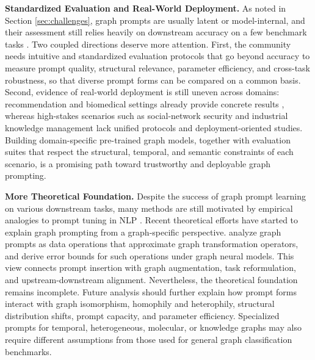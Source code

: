 \textbf{Standardized Evaluation and Real-World Deployment.} As noted in Section \ref{sec:challenges}, graph prompts are usually latent or model-internal, and their assessment still relies heavily on downstream accuracy on a few benchmark tasks \cite{hamilton2017inductive, xu2018how}. Two coupled directions deserve more attention. First, the community needs intuitive and standardized evaluation protocols that go beyond accuracy to measure prompt quality, structural relevance, parameter efficiency, and cross-task robustness, so that diverse prompt forms \cite{gong2024selfpro, ge2024psp, fu2025edge, yan2024igap} can be compared on a common basis. Second, evidence of real-world deployment is still uneven across domains: recommendation and biomedical settings already provide concrete results \cite{yang2024graphpro, zhang2024gpt4rec, wang2024ddiprompt}, whereas high-stakes scenarios such as social-network security and industrial knowledge management lack unified protocols and deployment-oriented studies. Building domain-specific pre-trained graph models, together with evaluation suites that respect the structural, temporal, and semantic constraints of each scenario, is a promising path toward trustworthy and deployable graph prompting.


\textbf{More Theoretical Foundation.} Despite the success of graph prompt learning on various downstream tasks, many methods are still motivated by empirical analogies to prompt tuning in NLP \cite{liu2022ptuning, brown2020language, gao2021making, tsimpoukelli2021multimodal, qin2021learning, shin2020autoprompt}. Recent theoretical efforts have started to explain graph prompting from a graph-specific perspective. \citet{wang2025does} analyze graph prompts as data operations that approximate graph transformation operators, and derive error bounds for such operations under graph neural models. This view connects prompt insertion with graph augmentation, task reformulation, and upstream-downstream alignment. Nevertheless, the theoretical foundation remains incomplete. Future analysis should further explain how prompt forms interact with graph isomorphism, homophily and heterophily, structural distribution shifts, prompt capacity, and parameter efficiency. Specialized prompts for temporal, heterogeneous, molecular, or knowledge graphs may also require different assumptions from those used for general graph classification benchmarks.


